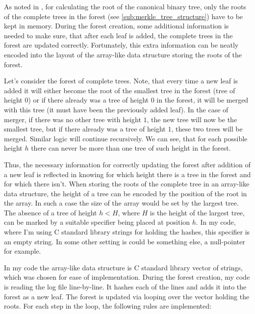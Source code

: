 \documentclass[11pt]{article}
\newcommand{\CC}{C\nolinebreak\hspace{-.05em}\raisebox{.4ex}{\tiny\bf +}\nolinebreak\hspace{-.10em}\raisebox{.4ex}{\tiny\bf +}}
\def\CC{{C\nolinebreak[4]\hspace{-.05em}\raisebox{.4ex}{\tiny\bf ++}} }
\begin{document}
As noted in \cite{Buldas2014}, for calculating the root of the canonical binary tree, only the roots of the complete trees in the forest (see \cref{sub:merkle_tree_structure}) have to be kept in memory. During the forest creation, some additional information is needed to make sure, that after each leaf is added, the complete trees in the forest are updated correctly. Fortunately, this extra information can be neatly encoded into the layout of the array-like data structure storing the roots of the forest. 

Let's consider the forest of complete trees. Note, that every time a new leaf is added it will either become the root of the smallest tree in the forest (tree of height $0$) or if there already was a tree of height $0$ in the forest, it will be merged with this tree (it must have been the previously added leaf). In the case of merger, if there was no other tree with height $1$, the new tree will now be the smallest tree, but if there already was a tree of height $1$, these two trees will be merged. Similar logic will continue recursively. We can see, that for each possible height $h$ there can never be more than one tree of such height in the forest.

Thus, the necessary information for correctly updating the forest after addition of a new leaf is reflected in knowing for which height there is a tree in the forest and for which there isn't. When storing the roots of the complete tree in an array-like data structure, the height of a tree can be encoded by the position of the root in the array. In such a case the size of the array would be set by the largest tree. The absence of a tree of height $h<H$, where $H$ is the height of the largest tree, can be marked by a suitable specifier being placed at position $h$. In my code, where I'm using \CC standard library strings for holding the hashes, this specifier is an empty string. In some other setting is could be something else, a null-pointer for example.

In my code the array-like data structure is \CC standard library vector of strings, which was chosen for ease of implementation. During the forest creation, my code is reading the log file line-by-line. It hashes each of the lines and adds it into the forest as a new leaf. The forest is updated via looping over the vector holding the roots. For each step in the loop, the following rules are implemented:
\end{document}
